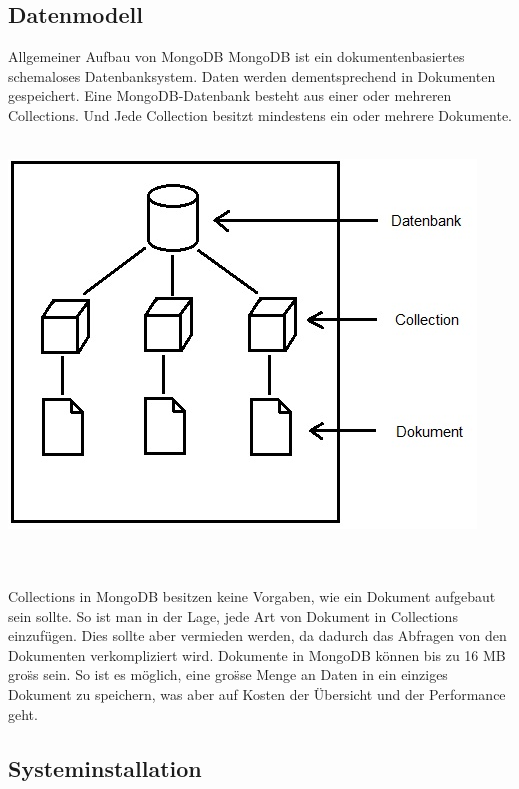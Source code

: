 \subsection{Datenmodell}
Allgemeiner Aufbau von MongoDB
MongoDB ist ein dokumentenbasiertes schemaloses Datenbanksystem. Daten werden dementsprechend in Dokumenten gespeichert. Eine MongoDB-Datenbank besteht aus einer oder mehreren Collections. Und Jede Collection besitzt mindestens ein oder mehrere Dokumente. 
\\
\\
\begin{minipage}{\textwidth}
    \centering
    \includegraphics[scale=0.9]{images/01_Datenmodell_Mongo.jpg}
    \label{fig:ver}
\end{minipage}
\\
\\
Collections in MongoDB besitzen keine Vorgaben, wie ein Dokument aufgebaut sein sollte. So ist man in der Lage, jede Art von Dokument in Collections einzuf\"ugen. Dies sollte aber vermieden werden, da dadurch das Abfragen von den Dokumenten verkompliziert wird. Dokumente in MongoDB k\"onnen bis zu 16 MB gro\"ss sein. So ist es m\"oglich, eine gro\"sse Menge an Daten in ein einziges Dokument zu speichern, was aber auf Kosten der \"Ubersicht und der Performance geht.
\subsection{Systeminstallation}
